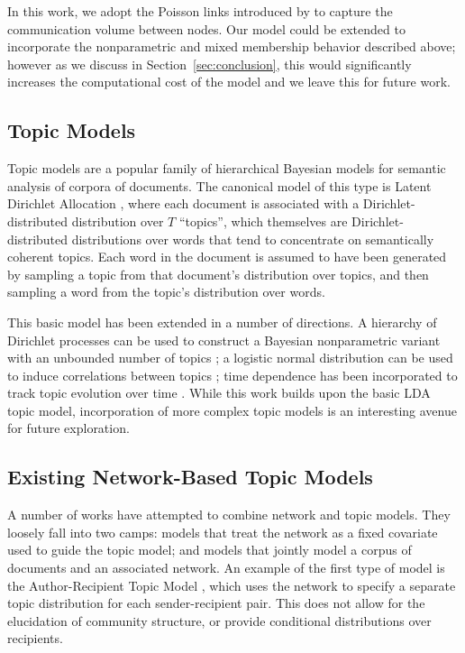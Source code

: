         In this work, we adopt the Poisson links introduced by \citep{Karrer:Newman:2011} to capture the communication volume between nodes. Our model could be extended to incorporate the nonparametric and mixed membership behavior described above; however as we discuss in Section~\ref{sec:conclusion}, this would significantly increases the computational cost of the model and we leave this for future work. 
    
    \subsection{Topic Models}
    
        Topic models are a popular family of hierarchical Bayesian models for semantic analysis of corpora of documents.  The canonical model of this type is Latent Dirichlet Allocation \cite{blei2003LDA}, where each document is associated with a Dirichlet-distributed distribution over $T$ ``topics'', which themselves are Dirichlet-distributed distributions over words that tend to concentrate on semantically coherent topics. Each word  in the  document is assumed to have been generated by sampling a topic from that document's distribution over topics, and then sampling a word from the topic's distribution over words. 
        
        This basic model has been extended in a number of directions. A hierarchy of Dirichlet processes can be used to construct a Bayesian nonparametric variant with an unbounded number of topics \citep{Teh:2007}; a logistic normal distribution can be used to induce correlations between topics \citep{ctm}; time dependence has been incorporated to track topic evolution over time \citep{blei2006dynamic}. While this work builds upon the basic  LDA topic model, incorporation of more complex topic models is an interesting avenue for future exploration.
    
    \subsection{Existing Network-Based Topic Models}\label{sec:related}
    
        A number of works have attempted to combine network and topic models. 
        They loosely fall into two camps: models that treat the network as a fixed covariate used to guide the topic model; and models that jointly model a corpus of documents and an associated network. An example of the first type of model is the Author-Recipient Topic Model \citep{mccallum2005}, which uses the network to specify a separate  topic distribution for each sender-recipient pair. This does not allow for the elucidation of community structure, or provide conditional distributions over recipients.
        
